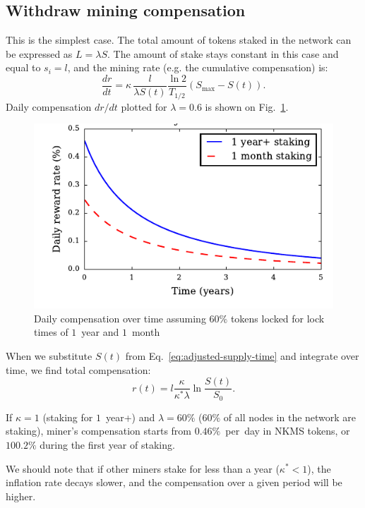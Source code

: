 \documentclass[longbibliography,nofootinbib,twocolumn]{revtex4-1}
\newcommand{\figref}[1]{Fig.~\ref{#1}}
\begin{document}
\subsection{Withdraw mining compensation}

This is the simplest case.
The total amount of tokens staked in the network can be expressed as $L=\lambda S$.
The amount of stake stays constant in this case and equal to $s_i = l$, and the mining rate (e.g. the cumulative compensation) is:
\begin{equation}
    \frac{dr}{dt} =  \kappa\, \frac{l}{\lambda S(t)} \frac{\ln{2}}{T_{1/2}} \left( S_{\max} - S(t)\right).
\end{equation}
Daily compensation $dr/dt$ plotted for $\lambda=0.6$ is shown on \figref{fig:daily-compensation}.

\begin{figure}
    \includegraphics[width=\columnwidth]{pdf/daily-compensation.pdf}
    \caption{Daily compensation over time assuming $60\%$ tokens locked for lock times of $1$~year and $1$~month}
    \label{fig:daily-compensation}
\end{figure}

When we substitute $S(t)$ from Eq.~\ref{eq:adjusted-supply-time} and integrate over time, we find total compensation:
\begin{equation}
    r(t) = l \frac{\kappa}{\kappa^* \lambda} \ln\frac{S(t)}{S_0}.
\end{equation}

If $\kappa=1$ (staking for $1$~year+) and $\lambda=60\%$ ($60\%$ of all nodes in the network are staking),
miner's compensation starts from $0.46\%$~per~day in NKMS tokens,
or $100.2\%$ during the first year of staking.

We should note that if other miners stake for less than a year ($\kappa^* < 1$), the inflation rate decays slower, and the compensation over a given period
will be higher.
\end{document}
